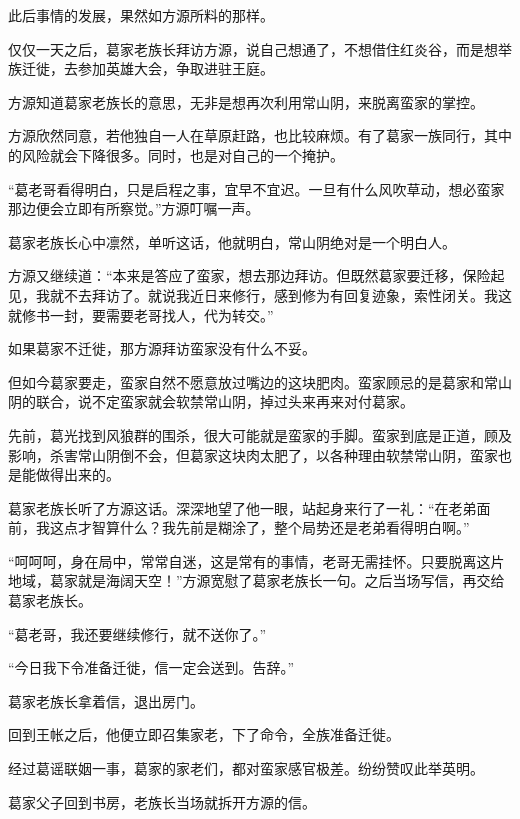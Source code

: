
\begin{this_body}

此后事情的发展，果然如方源所料的那样。

仅仅一天之后，葛家老族长拜访方源，说自己想通了，不想借住红炎谷，而是想举族迁徙，去参加英雄大会，争取进驻王庭。

方源知道葛家老族长的意思，无非是想再次利用常山阴，来脱离蛮家的掌控。

方源欣然同意，若他独自一人在草原赶路，也比较麻烦。有了葛家一族同行，其中的风险就会下降很多。同时，也是对自己的一个掩护。

“葛老哥看得明白，只是启程之事，宜早不宜迟。一旦有什么风吹草动，想必蛮家那边便会立即有所察觉。”方源叮嘱一声。

葛家老族长心中凛然，单听这话，他就明白，常山阴绝对是一个明白人。

方源又继续道：“本来是答应了蛮家，想去那边拜访。但既然葛家要迁移，保险起见，我就不去拜访了。就说我近日来修行，感到修为有回复迹象，索性闭关。我这就修书一封，要需要老哥找人，代为转交。”

如果葛家不迁徙，那方源拜访蛮家没有什么不妥。

但如今葛家要走，蛮家自然不愿意放过嘴边的这块肥肉。蛮家顾忌的是葛家和常山阴的联合，说不定蛮家就会软禁常山阴，掉过头来再来对付葛家。

先前，葛光找到风狼群的围杀，很大可能就是蛮家的手脚。蛮家到底是正道，顾及影响，杀害常山阴倒不会，但葛家这块肉太肥了，以各种理由软禁常山阴，蛮家也是能做得出来的。

葛家老族长听了方源这话。深深地望了他一眼，站起身来行了一礼：“在老弟面前，我这点才智算什么？我先前是糊涂了，整个局势还是老弟看得明白啊。”

“呵呵呵，身在局中，常常自迷，这是常有的事情，老哥无需挂怀。只要脱离这片地域，葛家就是海阔天空！”方源宽慰了葛家老族长一句。之后当场写信，再交给葛家老族长。

“葛老哥，我还要继续修行，就不送你了。”

“今日我下令准备迁徙，信一定会送到。告辞。”

葛家老族长拿着信，退出房门。

回到王帐之后，他便立即召集家老，下了命令，全族准备迁徙。

经过葛谣联姻一事，葛家的家老们，都对蛮家感官极差。纷纷赞叹此举英明。

葛家父子回到书房，老族长当场就拆开方源的信。


\end{this_body}
